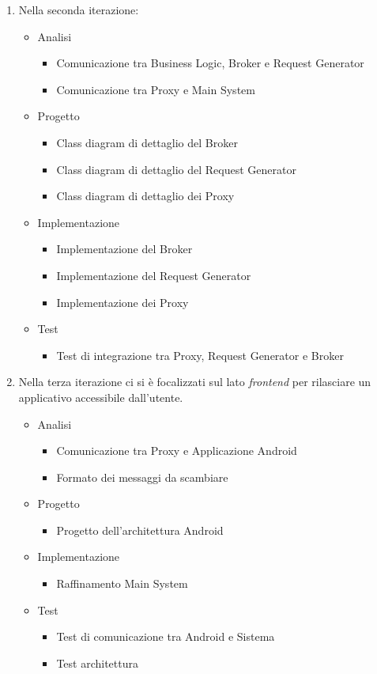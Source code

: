 \begin{enumerate}
	\item Nella seconda iterazione:
	\begin{itemize}
		\item Analisi
		\begin{itemize}
			\item Comunicazione tra Business Logic, Broker e Request Generator
			\item Comunicazione tra Proxy e Main System
		\end{itemize}
		\item Progetto
		\begin{itemize}
			\item Class diagram di dettaglio del Broker
			\item Class diagram di dettaglio del Request Generator
			\item Class diagram di dettaglio dei Proxy
		\end{itemize}
		\item Implementazione
		\begin{itemize}
			\item Implementazione del Broker
			\item Implementazione del Request Generator
			\item Implementazione dei Proxy
		\end{itemize}
		\item Test
		\begin{itemize}
			\item Test di integrazione tra Proxy, Request Generator e Broker
		\end{itemize}
	\end{itemize}
	\item Nella terza iterazione ci si è focalizzati sul lato \textit{frontend} per rilasciare un applicativo accessibile dall'utente.
		\begin{itemize}
			\item Analisi
			\begin{itemize}
				\item Comunicazione tra Proxy e Applicazione Android
				\item Formato dei messaggi da scambiare
			\end{itemize}
			\item Progetto
			\begin{itemize}
				\item Progetto dell'architettura Android
			\end{itemize}
			\item Implementazione
			\begin{itemize}
				\item Raffinamento Main System 
			\end{itemize}
			\item Test
			\begin{itemize}
				\item Test di comunicazione tra Android e Sistema
				\item Test architettura
			\end{itemize}
		\end{itemize}
\end{enumerate}

